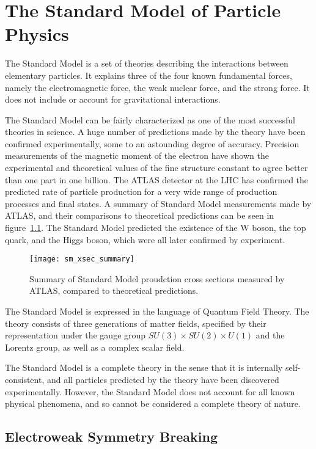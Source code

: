 \chapter{The Standard Model of Particle Physics}\label{ch:sm}

The Standard Model is a set of theories describing the interactions between elementary particles.
It explains three of the four known fundamental forces, namely the electromagnetic force,
the weak nuclear force, and the strong force.
It does not include  or account for gravitational interactions.

The Standard Model can be fairly characterized as one of the most successful theories in science.
A huge number of predictions made by the theory have been confirmed experimentally,
some to an astounding degree of accuracy.
Precision measurements of the magnetic moment of the electron have shown the experimental and theoretical values of the
fine structure constant to agree better than one part in one billion.\cite{sm-fine-structure-2008}
The ATLAS detector at the LHC has confirmed the predicted rate of particle production for a very wide range of
production processes and final states.
A summary of Standard Model measurements made by ATLAS, and their comparisons to theoretical predictions can be seen in figure~\ref{fig:sm_xsec_summary}.
The Standard Model predicted the existence of the W boson, the top quark, and the Higgs boson,
which were all later confirmed by experiment.

\begin{figure}[h]
\texttt{[image: sm\_xsec\_summary]}
\caption{Summary of Standard Model proudction cross sections measured by ATLAS, compared to theoretical predictions.}
\label{fig:sm_xsec_summary}
\end{figure}

The Standard Model is expressed in the language of Quantum Field Theory.
The theory consists of three generations of matter fields,
specified by their representation under the gauge group $SU(3)\times SU(2)\times U(1)$ and the Lorentz group,
as well as a complex scalar field.

The Standard Model is a complete theory in the sense that it is internally self-consistent,
and all particles predicted by the theory have been discovered experimentally.
However, the Standard Model does not account for all known physical phenomena,
and so cannot be considered a complete theory of nature.

\section{Electroweak Symmetry Breaking}\label{sec:sm_ew}

